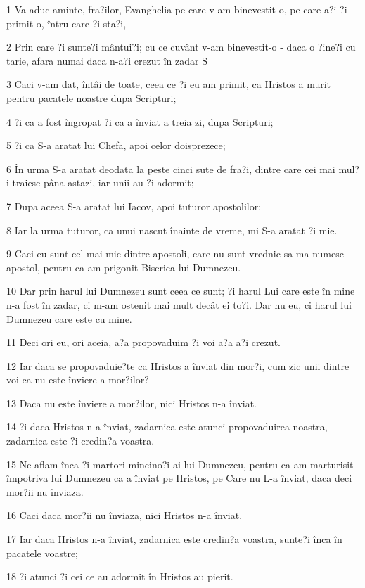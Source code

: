 \par 1 Va aduc aminte, fra?ilor, Evanghelia pe care v-am binevestit-o, pe care a?i ?i primit-o, întru care ?i sta?i,
\par 2 Prin care ?i sunte?i mântui?i; cu ce cuvânt v-am binevestit-o - daca o ?ine?i cu tarie, afara numai daca n-a?i crezut în zadar S
\par 3 Caci v-am dat, întâi de toate, ceea ce ?i eu am primit, ca Hristos a murit pentru pacatele noastre dupa Scripturi;
\par 4 ?i ca a fost îngropat ?i ca a înviat a treia zi, dupa Scripturi;
\par 5 ?i ca S-a aratat lui Chefa, apoi celor doisprezece;
\par 6 În urma S-a aratat deodata la peste cinci sute de fra?i, dintre care cei mai mul?i traiesc pâna astazi, iar unii au ?i adormit;
\par 7 Dupa aceea S-a aratat lui Iacov, apoi tuturor apostolilor;
\par 8 Iar la urma tuturor, ca unui nascut înainte de vreme, mi S-a aratat ?i mie.
\par 9 Caci eu sunt cel mai mic dintre apostoli, care nu sunt vrednic sa ma numesc apostol, pentru ca am prigonit Biserica lui Dumnezeu.
\par 10 Dar prin harul lui Dumnezeu sunt ceea ce sunt; ?i harul Lui care este în mine n-a fost în zadar, ci m-am ostenit mai mult decât ei to?i. Dar nu eu, ci harul lui Dumnezeu care este cu mine.
\par 11 Deci ori eu, ori aceia, a?a propovaduim ?i voi a?a a?i crezut.
\par 12 Iar daca se propovaduie?te ca Hristos a înviat din mor?i, cum zic unii dintre voi ca nu este înviere a mor?ilor?
\par 13 Daca nu este înviere a mor?ilor, nici Hristos n-a înviat.
\par 14 ?i daca Hristos n-a înviat, zadarnica este atunci propovaduirea noastra, zadarnica este ?i credin?a voastra.
\par 15 Ne aflam înca ?i martori mincino?i ai lui Dumnezeu, pentru ca am marturisit împotriva lui Dumnezeu ca a înviat pe Hristos, pe Care nu L-a înviat, daca deci mor?ii nu înviaza.
\par 16 Caci daca mor?ii nu înviaza, nici Hristos n-a înviat.
\par 17 Iar daca Hristos n-a înviat, zadarnica este credin?a voastra, sunte?i înca în pacatele voastre;
\par 18 ?i atunci ?i cei ce au adormit în Hristos au pierit.
